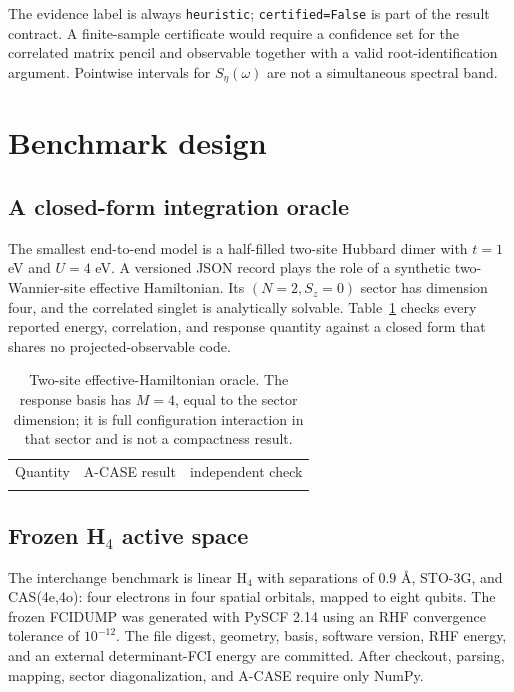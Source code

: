 \documentclass[aps,pra,reprint,superscriptaddress,nofootinbib,floatfix]{revtex4-2}
\begin{document}
The evidence label is always \texttt{heuristic}; \texttt{certified=False} is
part of the result contract.  A finite-sample certificate would require a
confidence set for the correlated matrix pencil and observable together with
a valid root-identification argument.  Pointwise intervals for
$S_\eta(\omega)$ are not a simultaneous spectral band.

\section{Benchmark design}
\label{sec:benchmarks}

\subsection{A closed-form integration oracle}
\label{sec:dimer}

The smallest end-to-end model is a half-filled two-site Hubbard dimer with
$t=1$ eV and $U=4$ eV.  A versioned JSON record plays the role of a synthetic
two-Wannier-site effective Hamiltonian.  Its $(N=2,S_z=0)$ sector has dimension
four, and the correlated singlet is analytically solvable.  Table~\ref{tab:dimer}
checks every reported energy, correlation, and response quantity against a
closed form that shares no projected-observable code.

\begin{table}[t]
\caption{Two-site effective-Hamiltonian oracle.  The response basis has
$M=4$, equal to the sector dimension; it is full configuration interaction in
that sector and is not a compactness result.}
\label{tab:dimer}
\begin{ruledtabular}
\begin{tabular}{lcc}
Quantity & A-CASE result & independent check \\
\colrule

\end{tabular}
\end{ruledtabular}
\end{table}

\subsection{Frozen \texorpdfstring{H$_4$}{H4} active space}
\label{sec:h4-benchmark}

The interchange benchmark is linear H$_4$ with separations of $0.9$ \AA,
STO-3G, and CAS(4e,4o): four electrons in four spatial orbitals, mapped to
eight qubits.  The frozen FCIDUMP was generated with PySCF 2.14
\cite{sun2018pyscf} using an RHF convergence tolerance of $10^{-12}$.
The file digest, geometry, basis, software version, RHF energy, and an external
determinant-FCI energy are committed.  After checkout, parsing, mapping,
sector diagonalization, and A-CASE require only NumPy.
\end{document}
